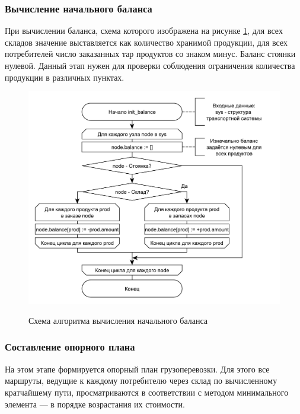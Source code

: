 \subsubsection{Вычисление начального баланса}
При вычислении баланса, схема которого изображена на рисунке \ref{alg:balance}, для всех складов значение выставляется как количество хранимой продукции, для всех потребителей число заказанных тар продуктов со знаком минус. Баланс стоянки нулевой. Данный этап нужен для проверки соблюдения ограничения количества продукции в различных пунктах. 

\pagebreak
\begin{figure}[h]
	\begin{center}
		{\includegraphics[scale=0.7, angle=0, page=1]{img/init_balance.pdf}}
		\caption{Схема алгоритма вычисления начального баланса}
		\label{alg:balance}
	\end{center}
\end{figure}

\subsubsection{Составление опорного плана}
На этом этапе формируется опорный план грузоперевозки. Для этого все маршруты, ведущие к каждому потребителю через склад по вычисленному \, кратчайшему пути, просматриваются в соответствии с методом минимального элемента --- в порядке возрастания их стоимости. 

